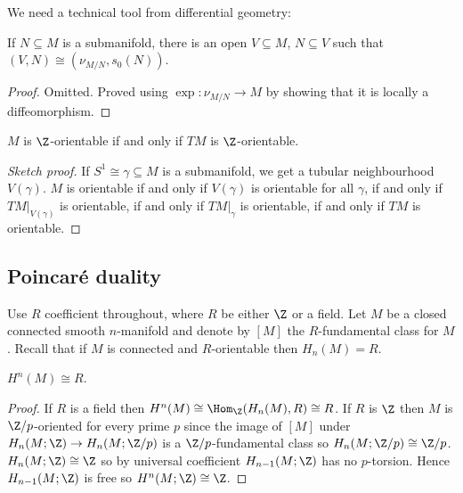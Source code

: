 \documentclass[a4paper]{article}
\begin{document}
We need a technical tool from differential geometry:

\begin{theorem}
  If \(N \subseteq M\) is a submanifold, there is an open \(V\subseteq M\), \(N \subseteq V\) such that \((V, N) \cong (\nu_{M/N}, s_0(N))\).
\end{theorem}

\begin{proof}
  Omitted. Proved using \(\exp: \nu_{M/N} \to M\) by showing that it is locally a diffeomorphism.
\end{proof}

\begin{proposition}
  \(M\) is \(\Z\)-orientable if and only if \(TM\) is \(\Z\)-orientable.
\end{proposition}

\begin{proof}[Sketch proof]
  If \(S^1 \cong \gamma \subseteq M\) is a submanifold, we get a tubular neighbourhood \(V(\gamma)\). \(M\) is orientable if and only if \(V(\gamma)\) is orientable for all \(\gamma\), if and only if \(TM|_{V(\gamma)}\) is orientable, if and only if \(TM|_\gamma\) is orientable, if and only if \(TM\) is orientable.
\end{proof}

\subsection{Poincaré duality}

Use \(R\) coefficient throughout, where \(R\) be either \(\Z\) or a field. Let \(M\) be a closed connected smooth \(n\)-manifold and denote by \([M]\) the \(R\)-fundamental class for \(M\). Recall that if \(M\) is connected and \(R\)-orientable then \(H_n(M) = R\).

\begin{corollary}
  \(H^n(M) \cong R\).
\end{corollary}

\begin{proof}
  If \(R\) is a field then \(H^n(M) \cong \Hom_\Z(H_n(M), R) \cong R\). If \(R\) is \(\Z\) then \(M\) is \(\Z/p\)-oriented for every prime \(p\) since the image of \([M]\) under \(H_n(M; \Z) \to H_n(M; \Z/p)\) is a \(\Z/p\)-fundamental class so \(H_n(M; \Z/p) \cong \Z/p\). \(H_n(M; \Z) \cong \Z\) so by universal coefficient \(H_{n - 1}(M; \Z)\) has no \(p\)-torsion. Hence \(H_{n - 1}(M; \Z)\) is free so \(H^n(M; \Z) \cong \Z\).
\end{proof}
\end{document}
